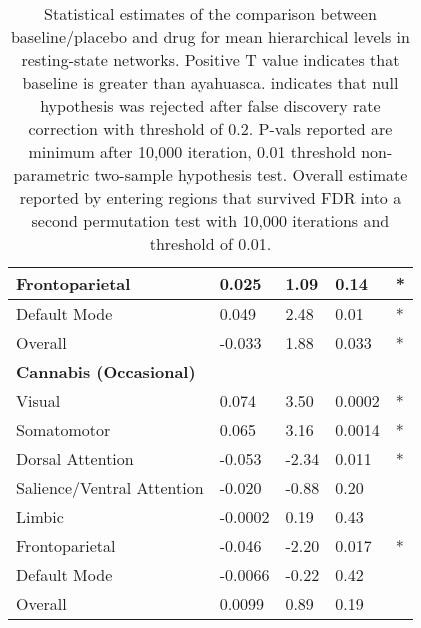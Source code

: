 \begin{table}[!ht]
\begin{tabular}{|l|l|l|l|l|}
        Frontoparietal & 0.025 & 1.09 & 0.14 & * \\ \hline
        Default Mode & 0.049 & 2.48 & 0.01 & * \\ \hline
        Overall & -0.033 & 1.88 & 0.033 & * \\ \hline
        \textbf{Cannabis (Occasional)}& ~ & ~ & ~ & ~ \\ \hline
        Visual & 0.074 & 3.50 & 0.0002 & * \\ \hline
        Somatomotor & 0.065 & 3.16 & 0.0014 & * \\ \hline
        Dorsal Attention & -0.053 & -2.34 & 0.011 & * \\ \hline
        Salience/Ventral Attention & -0.020 & -0.88 & 0.20 & ~ \\ \hline
        Limbic & -0.0002 & 0.19 & 0.43 & ~ \\ \hline
        Frontoparietal & -0.046 & -2.20 & 0.017 & * \\ \hline
        Default Mode & -0.0066 & -0.22 & 0.42 & ~ \\ \hline
        Overall & 0.0099 & 0.89 & 0.19 & ~ \\ \hline
    \end{tabular}
\caption{Statistical estimates of the comparison between baseline/placebo and drug for mean hierarchical levels in resting-state networks. Positive T value indicates that baseline is greater than ayahuasca. \* indicates that null hypothesis was rejected after false discovery rate correction with threshold of 0.2. P-vals reported are minimum after 10,000 iteration, 0.01 threshold non-parametric two-sample hypothesis test. Overall estimate reported by entering regions that survived FDR into a second permutation test with 10,000 iterations and threshold of 0.01.}
\label{tab:RSNDiff}
\end{table}